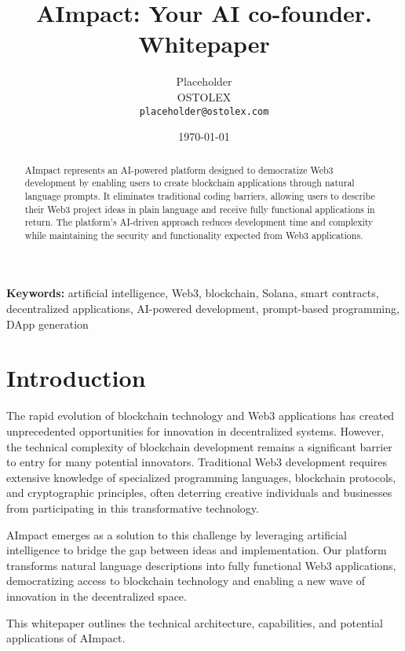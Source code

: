 \documentclass[12pt,a4paper]{article}
\title{AImpact: Your AI co-founder. Whitepaper}
\author{Placeholder \\ OSTOLEX \\ \texttt{placeholder@ostolex.com}}
\date{\today}
\begin{document}
\maketitle

\begin{abstract}
AImpact represents an AI-powered platform designed to democratize Web3 development by enabling users to create blockchain applications through natural language prompts. It eliminates traditional coding barriers, allowing users to describe their Web3 project ideas in plain language and receive fully functional applications in return. The platform's AI-driven approach reduces development time and complexity while maintaining the security and functionality expected from Web3 applications. 
\end{abstract}

\noindent\textbf{Keywords:} artificial intelligence, Web3, blockchain, Solana, smart contracts, decentralized applications, AI-powered development, prompt-based programming, DApp generation

\newpage

\tableofcontents
\newpage

\section{Introduction}
\label{sec:introduction}

The rapid evolution of blockchain technology and Web3 applications has created unprecedented opportunities for innovation in decentralized systems. However, the technical complexity of blockchain development remains a significant barrier to entry for many potential innovators. Traditional Web3 development requires extensive knowledge of specialized programming languages, blockchain protocols, and cryptographic principles, often deterring creative individuals and businesses from participating in this transformative technology.

AImpact emerges as a solution to this challenge by leveraging artificial intelligence to bridge the gap between ideas and implementation. Our platform transforms natural language descriptions into fully functional Web3 applications, democratizing access to blockchain technology and enabling a new wave of innovation in the decentralized space.

This whitepaper outlines the technical architecture, capabilities, and potential applications of AImpact.
\end{document}
